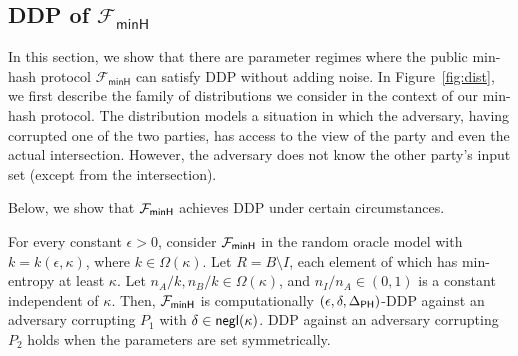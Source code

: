 \subsection{DDP of ${\mathcal{F}_\mathsf{minH}}$}\label{sec:ddp1} 
In this section, we show that there are parameter regimes where the public min-hash protocol ${\mathcal{F}_\mathsf{minH}}$ can satisfy DDP without adding noise. 
In Figure~\ref{fig:dist}, we first describe the family of distributions we consider in the context of our min-hash protocol. The distribution models a situation in which the adversary, having corrupted one of the two parties, has access to the view of the party and even the actual intersection. However, the adversary does not know the other party's input set (except from the intersection).  


Below, we show that ${\mathcal{F}_\mathsf{minH}}$ achieves DDP under certain circumstances. 

\begin{theorem}\label{thm:CDDP}
For every constant $\epsilon > 0$, consider ${\mathcal{F}_\mathsf{minH}}$ in the random oracle model with $k = k(\epsilon, \kappa)$, where $k \in \Omega(\kappa)$. 
Let $R = B \setminus I$, 
each element of which has min-entropy at least $\kappa$.  
Let $n_A/k, n_B/k \in
\Omega(\kappa)$, and $n_I/n_A \in (0, 1)$ is a constant independent of $\kappa$. 
Then, ${\mathcal{F}_\mathsf{minH}}$ is computationally $(\epsilon,\delta,\Delta_{\mathsf{PH}})$-DDP against an adversary corrupting $P_1$ with $\delta \in \mathsf{negl}(\kappa)$. DDP against an adversary corrupting $P_2$ holds when the parameters are set symmetrically.
\end{theorem}

